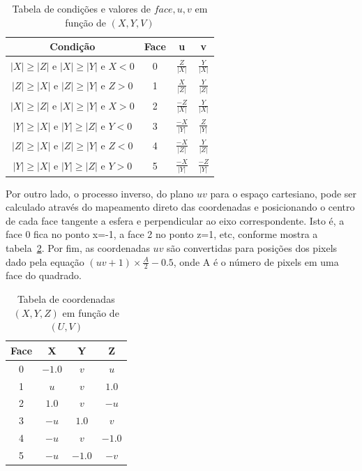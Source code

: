 \begin{table}[htb]
    \centering
    \caption{Tabela de condições e valores de \( face, u, v \) em função de $(X, Y, V)$}
    \label{tab:xyz2vu}
    \begin{tabular}{|c|c|c|c|}
        \hline
        \textbf{Condição} & \textbf{Face} & \textbf{u} & \textbf{v} \\
        \hline
        $ |X| \geq |Z|  \text{ e }  |X| \geq |Y|  \text{ e }  X < 0 $ & 0 &  $\frac{Z}{|X|}$ & $ \frac{Y}{|X|} $ \\
        $ |Z| \geq |X|  \text{ e }  |Z| \geq |Y|  \text{ e }  Z > 0 $ & 1 &  $\frac{X}{|Z|}$ & $ \frac{Y}{|Z|} $ \\
        $ |X| \geq |Z|  \text{ e }  |X| \geq |Y|  \text{ e }  X > 0 $ & 2 &  $\frac{-Z}{|X|}$  & $ \frac{Y}{|X|} $ \\
        $ |Y| \geq |X|  \text{ e }  |Y| \geq |Z|  \text{ e }  Y < 0 $ & 3 &  $\frac{-X}{|Y|} $ & $ \frac{Z}{|Y|} $ \\
        $ |Z| \geq |X|  \text{ e }  |Z| \geq |Y|  \text{ e }  Z < 0 $ & 4 &  $\frac{-X}{|Z|}$  & $ \frac{Y}{|Z|} $ \\
        $ |Y| \geq |X|  \text{ e }  |Y| \geq |Z|  \text{ e }  Y > 0 $ & 5 &  $\frac{-X}{|Y|}$  & $ \frac{-Z}{|Y|} $ \\
        \hline
    \end{tabular}
\end{table}

Por outro lado, o processo inverso, do plano $uv$ para o espaço cartesiano, pode ser calculado através do mapeamento direto das coordenadas e posicionando o centro de cada face tangente a esfera e perpendicular ao eixo correspondente. Isto é, a face 0 fica no ponto x=-1, a face 2 no ponto z=1, etc, conforme
mostra a tabela~\ref{tab:vu2xyz}. Por fim, as coordenadas $uv$ são convertidas para posições dos pixels dado pela equação $ (uv+1)\times \frac{A}{2}-0.5$, onde A é o número de pixels em uma face do quadrado.

\begin{table}[h]
	\centering
	\caption{Tabela de coordenadas $(X, Y, Z)$ em função de $(U, V)$}
	\label{tab:vu2xyz}
	\begin{tabular}{|c|c|c|c|}
		\hline
		\textbf{Face} & \textbf{X} & \textbf{Y} & \textbf{Z} \\
		\hline
		0 & $-1.0$ & $v$    & $u$    \\
		1 & $u$    & $v$    & $1.0$  \\
		2 & $1.0$  & $v$    & $-u$   \\
		3 & $-u$   & $1.0$  & $v$    \\
		4 & $-u$   & $v$    & $-1.0$ \\
		5 & $-u$   & $-1.0$ & $-v$   \\
		\hline
	\end{tabular}
\end{table}


